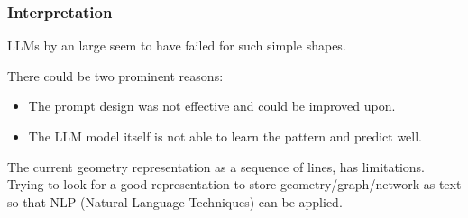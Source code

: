 \begin{frame}[fragile]\frametitle{Interpretation}

LLMs by an large seem to have failed for such simple shapes.

There could be two prominent reasons:

\begin{itemize}
\item The prompt design was not effective and could be improved upon.
\item The LLM model itself is not able to learn the pattern and predict well.
\end{itemize}	

The current geometry representation as a sequence of lines, has limitations. Trying to look for a good representation to store geometry/graph/network as text so that NLP (Natural Language Techniques) can be applied.
\end{frame}